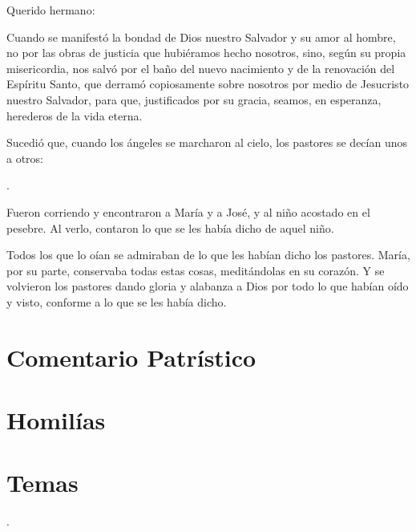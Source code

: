 \begin{scripture}
	Querido hermano:
	
	Cuando se manifestó la bondad de Dios nuestro Salvador y su amor al hombre, no por las obras de justicia que hubiéramos hecho nosotros, sino, según su propia misericordia, nos salvó por el baño del nuevo nacimiento y de la renovación del Espíritu Santo, que derramó copiosamente sobre nosotros por medio de Jesucristo nuestro Salvador, para que, justificados por su gracia, seamos, en esperanza, herederos de la vida eterna.
\end{scripture}


 


\begin{scripture}
	Sucedió que, cuando los ángeles se marcharon al cielo, los pastores se decían unos a otros:
	
	.
	
	Fueron corriendo y encontraron a María y a José, y al niño acostado en el pesebre. Al verlo, contaron lo que se les había dicho de aquel niño.
	
	Todos los que lo oían se admiraban de lo que les habían dicho los pastores. María, por su parte, conservaba todas estas cosas, meditándolas en su corazón. Y se volvieron los pastores dando gloria y alabanza a Dios por todo lo que habían oído y visto, conforme a lo que se les había dicho.
\end{scripture}

\newsection


\section{Comentario Patrístico}






\newsection		

\section{Homilías}
\homiliasNavidad




\newsection




\newsection




\newsection


\section{Temas}

\temasNavidad.